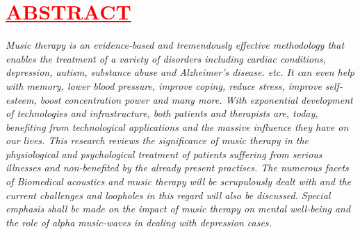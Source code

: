 \documentclass[12pt]{article}
\begin{document}
\section*{\textbf{\hspace{1cm}\textcolor{red}{\underline{\huge{ABSTRACT}}}}}
\hspace{1cm}\Large{\emph{Music therapy is an evidence-based and  tremendously effective methodology that enables the treatment of a variety of disorders including cardiac conditions, depression, autism, substance abuse and Alzheimer's disease. etc. It can even help with memory, lower blood pressure, improve coping, reduce stress, improve self-esteem, boost concentration power and many more. With exponential development of technologies and infrastructure, both patients and therapists are, today, benefiting from technological applications and the massive influence they have on our lives. This research reviews the significance of music therapy in the physiological and psychological treatment of patients suffering from serious illnesses and non-benefited by the already present practises. The numerous facets of Biomedical acoustics and music therapy will be scrupulously dealt with and the current challenges and loopholes in this regard will also be discussed. Special emphasis shall be made on the impact of music therapy on mental well-being and the role of alpha music-waves in dealing with depression cases.}}
\end{document}
